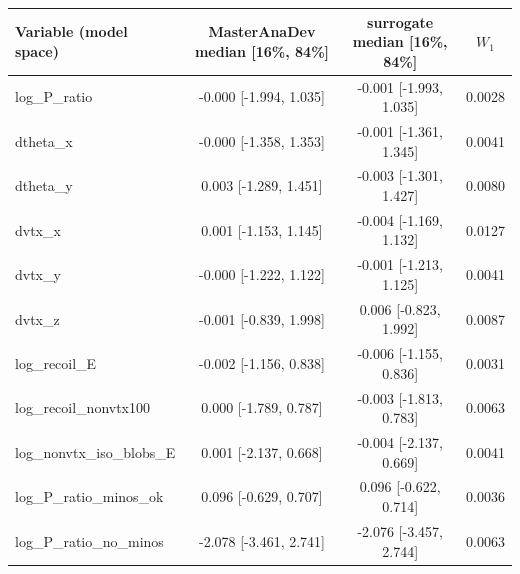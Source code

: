 \begin{tabular}{lccc}
\toprule
Variable (model space) & MasterAnaDev median [16\%, 84\%] & surrogate median [16\%, 84\%] & $W_1$ \\
\midrule
log\_P\_ratio & -0.000 [-1.994, 1.035] & -0.001 [-1.993, 1.035] & 0.0028 \\
dtheta\_x & -0.000 [-1.358, 1.353] & -0.001 [-1.361, 1.345] & 0.0041 \\
dtheta\_y & 0.003 [-1.289, 1.451] & -0.003 [-1.301, 1.427] & 0.0080 \\
dvtx\_x & 0.001 [-1.153, 1.145] & -0.004 [-1.169, 1.132] & 0.0127 \\
dvtx\_y & -0.000 [-1.222, 1.122] & -0.001 [-1.213, 1.125] & 0.0041 \\
dvtx\_z & -0.001 [-0.839, 1.998] & 0.006 [-0.823, 1.992] & 0.0087 \\
log\_recoil\_E & -0.002 [-1.156, 0.838] & -0.006 [-1.155, 0.836] & 0.0031 \\
log\_recoil\_nonvtx100 & 0.000 [-1.789, 0.787] & -0.003 [-1.813, 0.783] & 0.0063 \\
log\_nonvtx\_iso\_blobs\_E & 0.001 [-2.137, 0.668] & -0.004 [-2.137, 0.669] & 0.0041 \\
log\_P\_ratio\_minos\_ok & 0.096 [-0.629, 0.707] & 0.096 [-0.622, 0.714] & 0.0036 \\
log\_P\_ratio\_no\_minos & -2.078 [-3.461, 2.741] & -2.076 [-3.457, 2.744] & 0.0063 \\
\bottomrule
\end{tabular}
